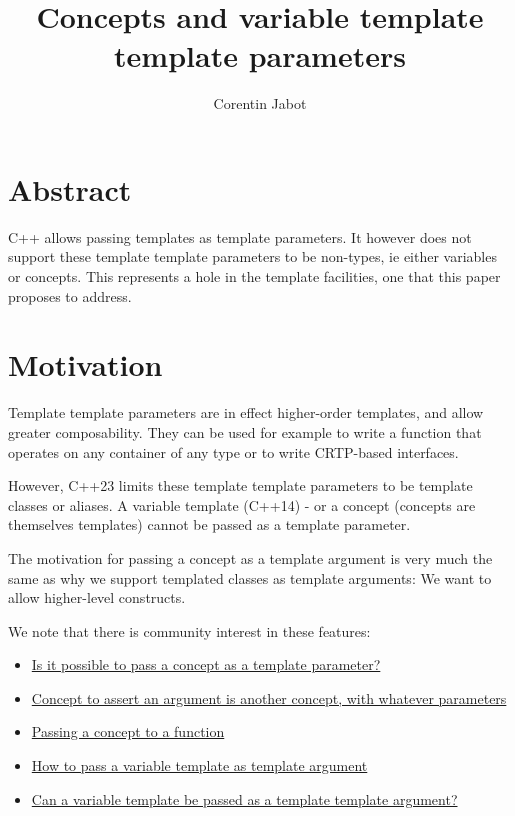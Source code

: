 \documentclass{wg21}
\title{Concepts and variable template template parameters}
\author{Corentin Jabot}{corentin.jabot@gmail.com}
\begin{document}
\maketitle

\section{Abstract}

C++ allows passing templates as template parameters.
It however does not support these template template parameters to be non-types, ie either variables or concepts.
This represents a hole in the template facilities, one that this paper proposes to address.

\section{Motivation}


Template template parameters are in effect higher-order templates, and allow greater composability.
They can be used for example to write a function that operates on any container of any type or to write CRTP-based interfaces.

However, C++23 limits these template template parameters to be template classes or aliases.
A variable template (C++14) - or a concept (concepts are themselves templates) cannot be passed as a template parameter.

The motivation for passing a concept as a template argument is very much the same as why we support templated classes as template arguments:
We want to allow higher-level constructs.

We note that there is community interest in these features:

\begin{itemize}
\item \href{https://stackoverflow.com/questions/63098070/is-it-possible-to-pass-a-concept-as-a-template-parameter}{Is it possible to pass a concept as a template parameter?}
\item \href{https://stackoverflow.com/questions/72488554/concept-to-assert-an-argument-is-another-concept-with-whatever-parameters?noredirect=1&lq=1}{Concept to assert an argument is another concept, with whatever parameters}
\item \href{https://stackoverflow.com/questions/58875829/passing-a-concept-to-a-function}{Passing a concept to a function}
\item \href{https://stackoverflow.com/questions/61664468/how-to-pass-a-variable-template-as-template-argument}{How to pass a variable template as template argument}
\item \href{https://stackoverflow.com/questions/58592312/can-a-variable-template-be-passed-as-a-template-template-argument}{Can a variable template be passed as a template template argument?}
\end{itemize}
\end{document}

